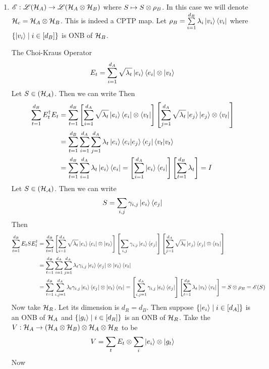 \documentclass[a4paper, 11pt]{article}
\begin{document}
{\begin{enumerate}[label=(\arabic*)]
	
	\item ${\mathscr{E}}:{\mathscr{L}}(\mathcal{H}_A)\to {\mathscr{L}}(\mathcal{H}_A\otimes \mathcal{H}_B)$ where $S\mapsto S\otimes \rho_B$. In this case we will denote $\mathcal{H}_c=\mathcal{H}_A\otimes \mathcal{H}_B$. This is indeed a CPTP map. Let $\rho_B=\sum\limits_{i=1}^{d_B}\lambda_i\ket{v_i}\bra{v_i}$ where $\{\ket{v_i}\mid i\in[d_B]\}$ is ONB of $\mathcal{H}_B$. 
	
	The Choi-Kraus Operator $$E_t=\sum_{i=1}^{d_A}\sqrt{\lambda_t}\ket{e_i}\bra{e_i}\otimes \ket{v_t}$$Let $S\in\sl(\mathcal{H}_A)$. Then we can write Then\begin{align*}
		\sum_{t=1}^{d_B}E_t^{\dagger}E_t & =\sum_{t=1}^{d_B}\left[\sum_{i=1}^{d_A}\sqrt{\lambda_t}\ket{e_i}\bra{e_i}\otimes \bra{v_t}\right]\left[\sum_{j=1}^{d_A}\sqrt{\lambda_t}\ket{e_j}\ket{e_j}\otimes \bra{v_t}\right]                                               \\
		                                & =\sum_{t=1}^{d_B}\sum_{i=1}^{d_A}\sum_{j=1}^{d_A}\lambda_t\ket{e_i}\bra{e_i}\ket{e_j}\bra{e_j} \bra{v_t}\ket{v_t}                                                                                          \\
		                                & =\sum_{t=1}^{d_B}\sum_{i=1}^{d_A}{\lambda_t}\ket{e_i}\bra{e_i}   =\left[\sum_{i=1}^{d_A}\ket{e_i}\bra{e_i}\right]\left[\sum_{t=1}^{d_B}\lambda_t  \right]=I
	\end{align*}Let $S\in\sl(\mathcal{H}_A)$. Then we can write $$S=\sum_{i,j}\gamma_{i,j}\ket{e_i}\bra{e_j}$$Then\begin{align*}
		\sum_{t=1}^{d_B}E_tSE_t^{\dagger} & =\sum_{t=1}^{d_B}\left[\sum_{i=1}^{d_A}\sqrt{\lambda_t}\ket{e_i}\bra{e_i}\otimes \ket{v_t}\right]\left[\sum_{i,j}\gamma_{i,j}\ket{e_i}\bra{e_j}\right]\left[\sum_{j=1}^{d_A}\sqrt{\lambda_t}\ket{e_j}\bra{e_j}\otimes \bra{v_t}\right]                                               \\
		                                & =\sum_{t=1}^{d_B}\sum_{i=1}^{d_A}\sum_{j=1}^{d_A}\lambda_t\gamma_{i,j}\ket{e_i}\bra{e_j}\otimes  \ket{v_t}\bra{v_t}                                                                                          \\
		                                & =\sum_{t=1}^{d_B}\sum_{i,j=1}^{d_A}{\lambda_t}\gamma_{i,j}\ket{e_i}\bra{e_j}\otimes  \ket{v_t}\bra{v_t}               =\left[\sum_{i,j=1}^{d_A}\gamma_{i,j}\ket{e_i}\bra{e_j}\right] \left[\sum_{t=1}^{d_B}\lambda_t \ket{v_t}\bra{v_t}               \right]=S\otimes \rho_B={\mathscr{E}}(S)
	\end{align*}Now take $\mathcal{H}_R$. Let its dimension is $d_R=d_B$. Then suppose $\{\ket{e_i}\mid i\in[d_A]\}$ is an ONB of $\mathcal{H}_A$ and $\{\ket{g_i}\mid i\in[d_R]\}$ is an ONB of $\mathcal{H}_R$. Take the $V:\mathcal{H}_A\to  ( \mathcal{H}_A\otimes \mathcal{H}_B)\otimes \mathcal{H}_A\otimes \mathcal{H}_R$ to be $$V=\sum_{t}E_t\otimes \sum_{i}\ket{e_i}\otimes \ket{g_t}$$Now 

\end{enumerate}}
\end{document}
